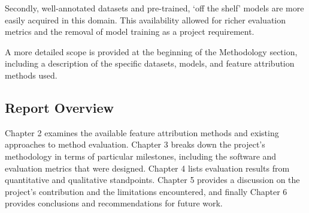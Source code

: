 \documentclass[main]{subfiles}
\begin{document}
Secondly, well-annotated datasets and pre-trained, `off the shelf' models are more easily acquired in this domain. This availability allowed for richer evaluation metrics and the removal of model training as a project requirement.

A more detailed scope is provided at the beginning of the Methodology section, including a description of the specific datasets, models, and feature attribution methods used.


\subsection*{Report Overview}

Chapter 2 examines the available feature attribution methods and existing approaches to method evaluation. Chapter 3 breaks down the project's methodology in terms of particular milestones, including the software and evaluation metrics that were designed. Chapter 4 lists evaluation results from quantitative and qualitative standpoints. Chapter 5 provides a discussion on the project's contribution and the limitations encountered, and finally Chapter 6 provides conclusions and recommendations for future work. 
\end{document}
